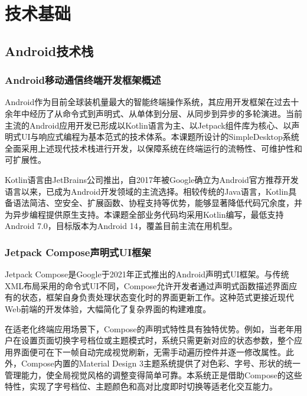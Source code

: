 




\chapter{技术基础}

\section{Android技术栈}

\subsection{Android移动通信终端开发框架概述}

Android作为目前全球装机量最大的智能终端操作系统，其应用开发框架在过去十余年中经历了从命令式到声明式、从单体到分层、从同步到异步的多轮演进。当前主流的Android应用开发已形成以Kotlin语言为主、以Jetpack组件库为核心、以声明式UI与响应式编程为基本范式的技术体系。本课题所设计的SimpleDesktop系统全面采用上述现代技术栈进行开发，以保障系统在终端运行的流畅性、可维护性和可扩展性。

Kotlin语言由JetBrains公司推出，自2017年被Google确立为Android官方推荐开发语言以来，已成为Android开发领域的主流选择。相较传统的Java语言，Kotlin具备语法简洁、空安全、扩展函数、协程支持等优势，能够显著降低代码冗余度，并为异步编程提供原生支持。本课题全部业务代码均采用Kotlin编写，最低支持Android 7.0，目标版本为Android 14，覆盖目前主流在用机型。

\subsection{Jetpack Compose声明式UI框架}

Jetpack Compose是Google于2021年正式推出的Android声明式UI框架。与传统XML布局采用的命令式UI不同，Compose允许开发者通过声明式函数描述界面应有的状态，框架自身负责处理状态变化时的界面更新工作。这种范式更接近现代Web前端的开发体验，大幅简化了复杂界面的构建难度。

在适老化终端应用场景下，Compose的声明式特性具有独特优势。例如，当老年用户在设置页面切换字号档位或主题模式时，系统只需更新对应的状态参数，整个应用界面便可在下一帧自动完成视觉刷新，无需手动遍历控件并逐一修改属性。此外，Compose内置的Material Design 3主题系统提供了对色彩、字号、形状的统一管理能力，使全局视觉风格的调整变得简单可靠。本系统正是借助Compose的这些特性，实现了字号档位、主题颜色和高对比度即时切换等适老化交互能力。


